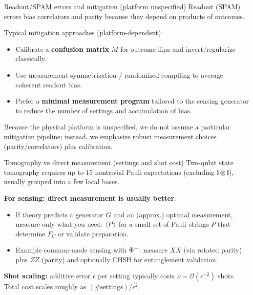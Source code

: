 \documentclass[aspectratio=169]{beamer}
\newcommand{\Id}{\mathbb{I}}
\begin{document}
\begin{frame}{Readout/SPAM errors and mitigation (platform unspecified)}
\small
Readout (SPAM) errors bias correlators and parity because they depend on products of outcomes.

\vspace{0.35em}
Typical mitigation approaches (platform-dependent):
\begin{itemize}
\item Calibrate a \textbf{confusion matrix} $M$ for outcome flips and invert/regularize classically.
\item Use measurement symmetrization / randomized compiling to average coherent readout bias.
\item Prefer a \textbf{minimal measurement program} tailored to the sensing generator to reduce the number of settings and accumulation of bias.
\end{itemize}

\vspace{0.35em}
Because the physical platform is unspecified, we do not assume a particular mitigation pipeline;
instead, we emphasize robust measurement choices (parity/correlators) plus calibration.
\end{frame}

\begin{frame}{Tomography vs direct measurement (settings and shot cost)}
\small
Two-qubit state tomography requires up to $15$ nontrivial Pauli expectations (excluding $\Id\otimes\Id$), usually grouped into a few local bases.

\vspace{0.35em}
\textbf{For sensing: direct measurement is usually better}:
\begin{itemize}
\item If theory predicts a generator $G$ and an (approx.) optimal measurement, measure only what you need:
$\expval{P}$ for a small set of Pauli strings $P$ that determine
$F_C$ or validate preparation.
\item Example common-mode sensing with $\relax{\Phi^+}$:
measure $XX$ (via rotated parity) plus $ZZ$ (parity) and optionally CHSH for entanglement validation.
\end{itemize}

\vspace{0.35em}
\textbf{Shot scaling:} additive error $\epsilon$ per setting typically costs $\nu=\mathcal{O}(\epsilon^{-2})$ shots.
Total cost scales roughly as $(\#\text{settings})/\epsilon^2$.
\end{frame}
\end{document}
